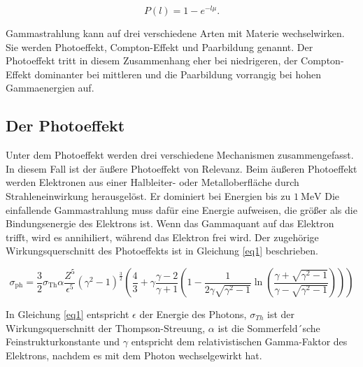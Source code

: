 \begin{equation}
    P(l) = 1 - e^{-l\mu}.
    \label{2.2}
\end{equation}

Gammastrahlung kann auf drei verschiedene Arten mit Materie wechselwirken.
Sie werden Photoeffekt, Compton-Effekt und Paarbildung genannt.
Der Photoeffekt tritt in diesem Zusammenhang eher bei niedrigeren, der 
Compton-Effekt dominanter bei mittleren und die Paarbildung vorrangig
bei hohen Gammaenergien auf.

\subsection{Der Photoeffekt}
Unter dem Photoeffekt werden drei verschiedene Mechanismen zusammengefasst.
In diesem Fall ist der äußere Photoeffekt von Relevanz.
Beim äußeren Photoeffekt werden Elektronen aus einer Halbleiter- oder Metalloberfläche 
durch Strahleneinwirkung herausgelöst. 
Er dominiert bei Energien bis zu $\SI{1}{\mega\eV}$
Die einfallende Gammastrahlung muss dafür eine Energie aufweisen, die größer als die 
Bindungsenergie des Elektrons ist. Wenn das Gammaquant auf das Elektron trifft, wird es 
annihiliert, während das Elektron frei wird. Der zugehörige 
Wirkungsquerschnitt des Photoeffekts ist in Gleichung \ref{eq1} beschrieben.

\begin{equation}
    \sigma_{\text{ph}} = \frac{3}{2} \sigma_{\text{Th}} \alpha \frac{Z^5}{\epsilon^5} (\gamma^2 -1)^{\frac{3}{2}} \left(\frac{4}{3} + \gamma\frac{\gamma -2}{\gamma+1} \left(1 - \frac{1}{2 \gamma \sqrt{\gamma^2 -1}} \ln\left(\frac{\gamma + \sqrt{\gamma^2 - 1}}{\gamma - \sqrt{\gamma^2 -1}} \right) \right) \right)
    \label{eq1}
\end{equation}

In Gleichung \ref{eq1} entspricht $\epsilon$ der Energie des Photons, $\sigma_{Th}$
ist der Wirkungsquerschnitt der Thompson-Streuung, $\alpha$ ist die 
Sommerfeld´sche Feinstrukturkonstante und $\gamma$ entspricht dem relativistischen 
Gamma-Faktor des Elektrons, nachdem es mit dem Photon wechselgewirkt hat.

